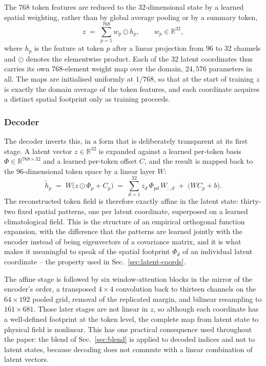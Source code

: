 The 768 token features are reduced to the 32-dimensional state by a learned spatial weighting,
rather than by global average pooling or by a summary token,
\[
z \;=\; \sum_{p=1}^{768} w_p \odot h_p, \qquad w_p \in \mathbb{R}^{32},
\]
where $h_p$ is the feature at token $p$ after a linear projection from 96 to 32 channels and
$\odot$ denotes the elementwise product. Each of the 32 latent coordinates thus carries its own
768-element weight map over the domain, $24{,}576$ parameters in all. The maps are initialised
uniformly at $1/768$, so that at the start of training $z$ is exactly the domain average of the
token features, and each coordinate acquires a distinct spatial footprint only as training
proceeds.

\subsubsection{Decoder}
\label{sec:decoder}

The decoder inverts this, in a form that is deliberately transparent at its first stage. A
latent vector $z\in\mathbb{R}^{32}$ is expanded against a learned per-token basis
$\Phi\in\mathbb{R}^{768\times32}$ and a learned per-token offset $C$, and the result is mapped
back to the 96-dimensional token space by a linear layer $W$:
\[
\tilde h_p \;=\; W\bigl(z \odot \Phi_p + C_p\bigr)
          \;=\; \sum_{d=1}^{32} z_d\,\Phi_{pd}\,W_{:,d} \;+\; \bigl(WC_p + b\bigr).
\]
The reconstructed token field is therefore exactly affine in the latent state: thirty-two fixed
spatial patterns, one per latent coordinate, superposed on a learned climatological field. This
is the structure of an empirical orthogonal function expansion, with the difference that the
patterns are learned jointly with the encoder instead of being eigenvectors of a covariance
matrix, and it is what makes it meaningful to speak of the spatial footprint $\Phi_d$ of an
individual latent coordinate -- the property used in Sec.~\ref{sec:latent-coords}.

The affine stage is followed by six window-attention blocks in the mirror of the encoder's
order, a transposed $4\times4$ convolution back to thirteen channels on the $64\times192$
pooled grid, removal of the replicated margin, and bilinear resampling to $161\times681$. Those
later stages are not linear in $z$, so although each coordinate has a well-defined footprint at
the token level, the complete map from latent state to physical field is nonlinear. This has
one practical consequence used throughout the paper: the blend of Sec.~\ref{sec:blend} is
applied to decoded indices and not to latent states, because decoding does not commute with a
linear combination of latent vectors.

